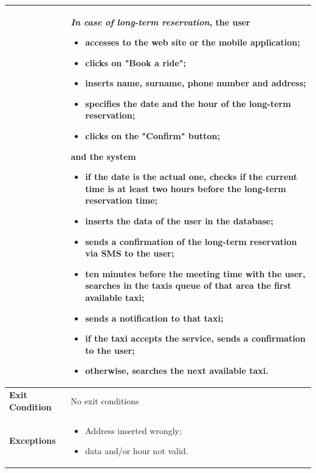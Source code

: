   \newpage
 \begin{tabular}{l l}
 & \parbox{0.7\textwidth}{
 \emph{In case of long-term reservation}, the user
 \begin{itemize}
 \item accesses to the web site or the mobile application;
 \item clicks on "Book a ride";
 \item inserts name, surname, phone number and address;
 \item specifies the date and the hour of the long-term reservation;
 \item clicks on the "Confirm" button;
 \end{itemize}
 and the system
 \begin{itemize}
 \item if the date is the actual one, checks if the current time is at least two hours before the long-term reservation time;
 \item inserts the data of the user in the database;
 \item sends a confirmation of the long-term reservation via SMS to the user;
 \item ten minutes before the meeting time with the user, searches in the taxis queue of that area the first available taxi;
 \item sends a notification to that taxi;
 \item if the taxi accepts the service, sends a confirmation to the user;
 \item otherwise, searches the next available taxi.
 \end{itemize}
 } \\ \hline
 \textbf{Exit Condition} & No exit conditions \\ \hline
 \textbf{Exceptions} &  \parbox{0.7\textwidth}{ 
 \begin{itemize}
 \item Address inserted wrongly;
 \item data and/or hour not valid.
 \end{itemize}
 }
\end{tabular}

